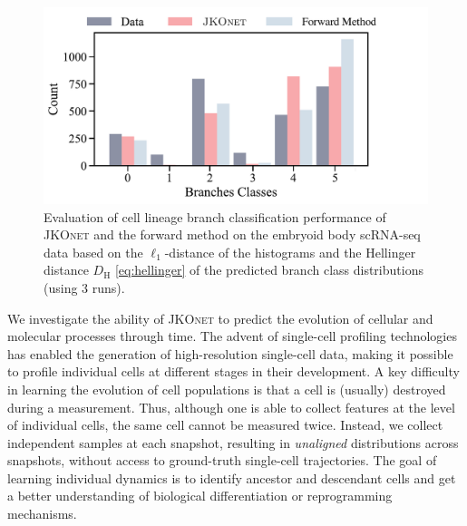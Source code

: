 \begin{figure}[t]
    \includegraphics[width=.47\linewidth]{figures/fig_distribution_cell_types_Branches.pdf}
	\qquad
\caption{Evaluation of cell lineage branch classification performance of \textsc{JKOnet} and the forward method on the embryoid body scRNA-seq data based on the $\ell_1$-distance of the histograms and the Hellinger distance $D_{\mathrm{H}}$ \eqref{eq:hellinger} of the predicted branch class distributions (using 3 runs). \vspace{10pt}}
\label{tab:exp_jkonet_cell_class}
\end{figure}

We investigate the ability of \textsc{JKOnet} to predict the evolution of cellular and molecular processes through time.
The advent of single-cell profiling technologies has enabled the generation of high-resolution single-cell data, making it possible to profile individual cells at different stages in their development. 
A key difficulty in learning the evolution of cell populations is that a cell is (usually)  destroyed during a measurement. Thus, although one is able to collect features at the level of individual cells, the same cell cannot be measured twice. Instead, we collect independent samples at each snapshot, resulting in \emph{unaligned} distributions across snapshots, without access to ground-truth single-cell trajectories. 
The goal of learning individual dynamics is to identify ancestor and descendant cells and get a better understanding of biological differentiation or reprogramming mechanisms. 

